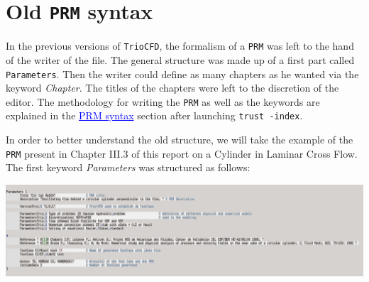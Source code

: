 \section{\label{sec:Old-PRM-syntax}Old \texttt{PRM} syntax}
In the previous versions of \texttt{TrioCFD}, the formalism of a \texttt{PRM} was left to the hand of the writer of the file. 
The general structure was made up of a first part called \texttt{Parameters}. Then the writer could define as many chapters as he wanted via the keyword \textit{Chapter}.
The titles of the chapters were left to the discretion of the editor.
The methodology for writing the \texttt{PRM} as well as the keywords are explained in the \textcolor{blue}{\underline{PRM syntax}} section after launching \verb "trust -index".\newline \newline

In order to better understand the old structure, we will take the example of the \texttt{PRM} present in Chapter III.3 of
this report on a Cylinder in Laminar Cross Flow. The first keyword \textit{Parameters} was structured as follows:\newline
\begin{center}\includegraphics[width=16cm]{tools/parameters_PRM_1.png}\end{center}
\begin{center}\end{center}

